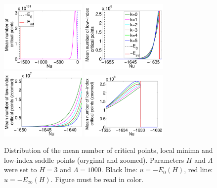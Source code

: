 \documentclass[twoside]{article}
\begin{document}
\begin{figure}[htp!]
  \center
\includegraphics[width = 1.65in]{Distr_cp.pdf}
\includegraphics[width = 1.65in]{Distr_lm_sp_li.pdf} 
\includegraphics[width = 1.65in]{Distr_lm_sp_li_zoomed_left.pdf} 
\includegraphics[width = 1.65in]{Distr_lm_sp_li_zoomed_right.pdf} 
\vspace{-0.3in}
\caption{Distribution of the mean number of critical points, local minima and low-index saddle points (oryginal and zoomed). Parameters $H$ and $\Lambda$ were set to $H = 3$ and $\Lambda = 1000$. Black line: $u = -E_0(H)$, red line: $u = -E_{\infty}(H)$. Figure must be read in color.}
\label{fig:Distr_cp_lm_sp}
\vspace{-0.1in}
\end{figure}
\end{document}
